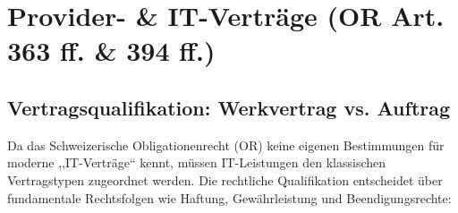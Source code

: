 \section{Provider- \& IT-Verträge (OR Art. 363 ff. \& 394 ff.)}

\subsection{Vertragsqualifikation: Werkvertrag vs. Auftrag}

Da das Schweizerische Obligationenrecht (OR) keine eigenen Bestimmungen für moderne ,,IT-Verträge`` kennt, müssen IT-Leistungen den klassischen Vertragstypen zugeordnet werden. Die rechtliche Qualifikation entscheidet über fundamentale Rechtsfolgen wie Haftung, Gewährleistung und Beendigungsrechte:

